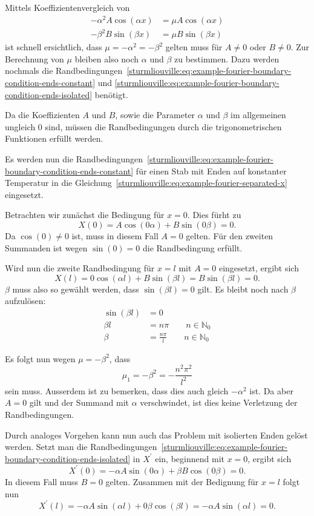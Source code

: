 Mittels Koeffizientenvergleich von
\[
\begin{aligned}
    -\alpha^{2}A\cos(\alpha x)
    &=
    \mu A\cos(\alpha x)
    \\
    -\beta^{2}B\sin(\beta x)
    &=
    \mu B\sin(\beta x)
\end{aligned}
\]
ist schnell ersichtlich, dass $ \mu = -\alpha^{2} = -\beta^{2} $ gelten muss für
$ A \neq 0 $ oder $ B \neq 0 $.
Zur Berechnung von $ \mu $ bleiben also noch  $ \alpha $ und $ \beta $ zu
bestimmen.
Dazu werden nochmals die
Randbedingungen~\eqref{sturmliouville:eq:example-fourier-boundary-condition-ends-constant} 
und \eqref{sturmliouville:eq:example-fourier-boundary-condition-ends-isolated}
benötigt.

Da die Koeffizienten $A$ und $B$, sowie die Parameter $\alpha$ und $\beta$ im
allgemeinen ungleich $0$ sind, müssen die Randbedingungen durch die
trigonometrischen Funktionen erfüllt werden.

Es werden nun die 
Randbedingungen~\eqref{sturmliouville:eq:example-fourier-boundary-condition-ends-constant}
für einen Stab mit Enden auf konstanter Temperatur in die
Gleichung~\eqref{sturmliouville:eq:example-fourier-separated-x} eingesetzt.

Betrachten wir zunächst die Bedingung für $x = 0$.
Dies fürht zu
\[
    X(0)
    =
    A \cos(0 \alpha) + B \sin(0 \beta)
    =
    0.
\]
Da $\cos(0) \neq 0$ ist, muss in diesem Fall $A = 0$ gelten.
Für den zweiten Summanden ist wegen $\sin(0) = 0$ die Randbedingung erfüllt.

Wird nun die zweite Randbedingung für $x = l$ mit $A = 0$ eingesetzt, ergibt
sich
\[
    X(l)
    =
    0 \cos(\alpha l) + B \sin(\beta l)
    =
    B \sin(\beta l)
    = 0.
\]
$\beta$ muss also so gewählt werden, dass $\sin(\beta l) = 0$ gilt.
Es bleibt noch nach $\beta$ aufzulösen:
\[
\begin{aligned}
    \sin(\beta l) &= 0 \\
    \beta l &= n \pi \qquad n \in \mathbb{N}_0 \\
    \beta &= \frac{n \pi}{l} \qquad n \in \mathbb{N}_0
\end{aligned}
\]

Es folgt nun wegen $\mu = -\beta^{2}$, dass
\[
    \mu_1 = -\beta^{2} = -\frac{n^{2}\pi^{2}}{l^{2}}
\]
sein muss.
Ausserdem ist zu bemerken, dass dies auch gleich $-\alpha^{2}$ ist.
Da aber $A = 0$ gilt und der Summand mit $\alpha$ verschwindet, ist dies keine
Verletzung der Randbedingungen.

Durch analoges Vorgehen kann nun auch das Problem mit isolierten Enden gelöst
werden.
Setzt man die 
Randbedingungen~\eqref{sturmliouville:eq:example-fourier-boundary-condition-ends-isolated}
in $X^{\prime}$ ein, beginnend mit $x = 0$, ergibt sich
\[
    X^{\prime}(0)
    =
    -\alpha A \sin(0 \alpha) + \beta B \cos(0 \beta)
    = 0.
\]
In diesem Fall muss $B = 0$ gelten.
Zusammen mit der Bedignung für $x = l$
folgt nun
\[
    X^{\prime}(l)
    =
    - \alpha A \sin(\alpha l) + 0 \beta \cos(\beta l)
    =
    - \alpha A \sin(\alpha l)
    = 0.
\]

